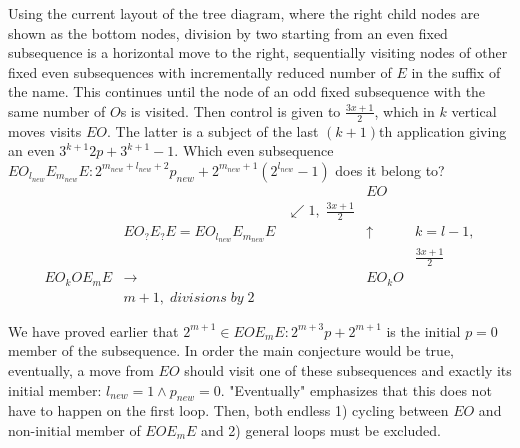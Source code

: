 \documentclass{article}
\begin{document}
Using the current layout of the tree diagram, where the right child nodes are shown as the bottom nodes, division by two starting from an even fixed subsequence is a horizontal move to the right, sequentially visiting nodes of other fixed even subsequences with incrementally reduced number of $E$ in the suffix of the name. This continues until the node of an odd fixed subsequence with the same number of $O$s is visited. Then control is given to $\frac{3x+1}{2}$, which in $k$ vertical moves visits $EO$. The latter is a subject of the last $(k+1)$th application giving an even $3^{k+1}2p + 3^{k+1} - 1$. Which even subsequence $EO_{l_{new}}{E_{m_{new}}}E : 2^{m_{new} + l_{new} + 2}p_{new} + 2^{m_{new}+1}(2^{l_{new}} -1)$ does it belong to?
\begin{displaymath}
\begin{array}{rcrcc}
&&&EO&\\
&&\swarrow 1,\; \frac{3x+1}{2}&&\\
&EO_?E_?E = EO_{l_{new}}{E_{m_{new}}}E&&\uparrow&k = l - 1,\\
&&&&\frac{3x+1}{2}\\
E{O_k}O{E_m}E&\to&&E{O_k}O&\\
&m+1, \; divisions \; by \; 2&&&
\end{array}
\end{displaymath}

We have proved earlier that $2^{m+1} \in EO{E_m}E : 2^{m + 3}p+2^{m+1}$ is the initial $p = 0$ member of the subsequence. In order the main conjecture would be true, eventually, a move from $EO$ should visit one of these subsequences and exactly its initial member: $l_{new}=1 \wedge p_{new}=0$. "Eventually" emphasizes that this does not have to happen on the first loop. Then, both endless 1) cycling between $EO$ and non-initial member of $EO{E_m}E$ and 2) general loops must be excluded.
\end{document}
